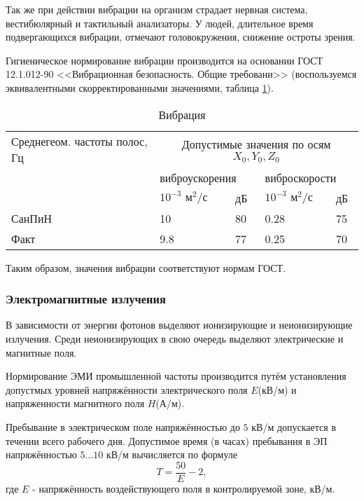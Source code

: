 Так же при действии вибрации на организм страдает нервная система, вестибюлярный и тактильный анализаторы. У людей, длительное время под\-вергающихся вибрации, отме\-чают головокружения, снижение остроты зрения.

Гигиеническое нормирование вибрации производится на основании ГОСТ 12.1.012-90 <<Вибрационная безопасность. Общие требовани>> (воспользуемся эквивалентными скор\-ректированными значениями, таблица \ref{vibration}).

\begin{table}[H]
\caption{Вибрация \label{vibration}}
\begin{center}
\begin{tabular}{|p{4.1cm}|p{2cm}|p{1cm}|p{2cm}|p{1cm}|}
\hline
Среднегеом. частоты полос, Гц & \multicolumn{4}{|c|}{Допустимые значения по осям $X_0, Y_0, Z_0$  } \\
\cline{2-5}
       & \multicolumn{2}{|l|}{виброускорения                   }&\multicolumn{2}{|l|}{ виброскорости                    } \\
\cline{2-5}
       & $10^{-3} \mbox{ м}^2 / \mbox{с}$  & дБ & $10^{-3} \mbox{ м}^2 / \mbox{с}$  & дБ   \\
\hline
СанПиН & 10                                & 80 & 0.28                              & 75   \\
\hline
Факт   & 9.8                               & 77 & 0.25                              & 70   \\
\hline
\end{tabular}
\end{center}
\end{table}

Таким образом, значения вибрации соответствуют нормам ГОСТ.

\subsubsection{Электромагнитные излучения}

В зависимости от энергии фотонов выделяют ионизирующие и неиони\-зирующие излу\-чения. Среди неионизирующих в свою очередь выделяют элек\-трические и магнитные поля.

Нормирование ЭМИ промышленной частоты производится путём уста\-новления допус\-тмых уровней напряжённости электрического поля $E$(кВ/м) и напряженности маг\-нитного поля $H$(А/м).

Пребывание в электрическом поле напряжённостью до $5$ кВ/м допускается в течении всего рабочего дня. Допустимое время (в часах) пребывания в ЭП напряжённостью $5 \ldots 10$ кВ/м вычисляется по формуле
$$
T = \frac{50}{E} - 2,
$$
где $E$ - напряжённость воздействующего поля в контролируемой зоне, кВ/м.

